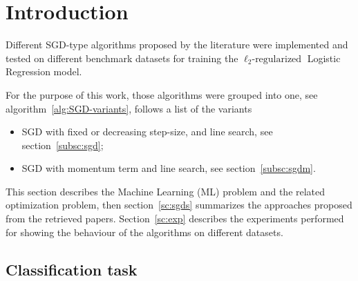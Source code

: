 \section{Introduction}\label{sc:intro}


Different SGD-type algorithms proposed by the literature were implemented and tested on different benchmark datasets for training the $\ell_2\text{-regularized}$ Logistic Regression model.

For the purpose of this work, those algorithms were grouped into one, see algorithm~\vref{alg:SGD-variants}, follows a list of the variants
\begin{itemize}
\item SGD with fixed or decreasing step-size, and line search, see section~\vref{subsc:sgd};
\item SGD with momentum term and line search, see section~\vref{subsc:sgdm}.
\end{itemize}


This section describes the Machine Learning (ML) problem and the related optimization problem, then section~\vref{sc:sgds} summarizes the approaches proposed from the retrieved papers. Section~\vref{sc:exp} describes the experiments performed for showing the behaviour of the algorithms on different datasets.

\subsection{Classification task}

